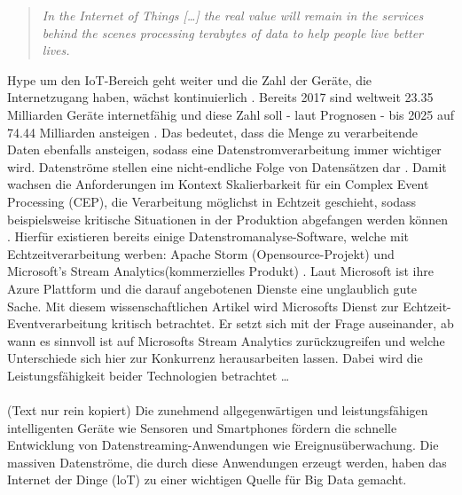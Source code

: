 
\begin{quote} \textit{\glqq In the Internet of Things […] the real value will remain in the services behind the scenes processing terabytes of data to help people live better lives. \grqq~}\cite{Floarea.2014}\\ \end{quote} 

 Hype um den IoT-Bereich geht weiter und die Zahl der Geräte, die Internetzugang haben, wächst kontinuierlich \cite{peter.2015}. Bereits 2017 sind weltweit 23.35 Milliarden Geräte internetfähig und diese Zahl soll - laut Prognosen - bis 2025 auf 74.44 Milliarden ansteigen \cite{Statista.2017}. Das bedeutet, dass die Menge zu verarbeitende Daten ebenfalls ansteigen, sodass eine Datenstromverarbeitung immer wichtiger wird. Datenströme stellen eine nicht-endliche Folge von Datensätzen dar \cite{Mock.2005}. Damit wachsen die Anforderungen im Kontext Skalierbarkeit für ein Complex Event Processing (CEP), die Verarbeitung möglichst in Echtzeit geschieht, sodass beispielsweise kritische Situationen in der Produktion abgefangen werden können \cite{rcrwireless.2016}. Hierfür existieren  bereits einige Datenstromanalyse-Software, welche mit Echtzeitverarbeitung werben: Apache Storm (Opensource-Projekt) \cite{apache.2017} und Microsoft's Stream Analytics(kommerzielles Produkt) \cite{Microsoft.2017}. Laut Microsoft ist ihre Azure Plattform und die darauf angebotenen Dienste eine unglaublich gute Sache. Mit diesem wissenschaftlichen Artikel wird Microsofts Dienst zur Echtzeit-Eventverarbeitung kritisch betrachtet. Er setzt sich mit der Frage auseinander, ab wann es sinnvoll ist auf Microsofts Stream Analytics zurückzugreifen und welche Unterschiede sich hier zur Konkurrenz herausarbeiten lassen. Dabei wird die Leistungsfähigkeit beider Technologien betrachtet … \\ \\
(Text nur rein kopiert) Die zunehmend allgegenwärtigen und leistungsfähigen intelligenten Geräte wie Sensoren und Smartphones fördern die schnelle Entwicklung von Datenstreaming-Anwendungen wie Ereignusüberwachung. Die massiven Datenströme, die durch diese Anwendungen erzeugt werden, haben das Internet der Dinge (loT) zu einer wichtigen Quelle für Big Data gemacht. 
